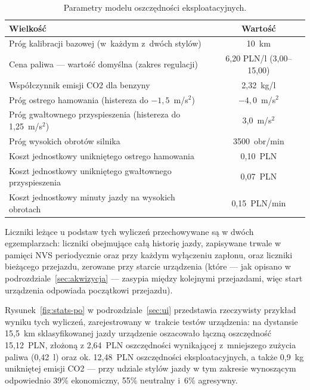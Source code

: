\begin{table}[!h]
    \centering
    \caption{Parametry modelu oszczędności eksploatacyjnych.}
    \label{tab:model-oszczednosci}
    \begin{tabular}{| p{7.8cm} | c |} \hline
        \textbf{Wielkość} & \textbf{Wartość} \\ \hline\hline
        Próg kalibracji bazowej (w~każdym z~dwóch stylów) & 10~km \\ \hline
        Cena paliwa --- wartość domyślna (zakres regulacji) & 6,20 PLN/l (3,00--15,00) \\ \hline
        Współczynnik emisji CO2 dla benzyny & 2,32~kg/l \\ \hline
        Próg ostrego hamowania (histereza do $-1{,}5$~m/s$^2$) & $-4{,}0$~m/s$^2$ \\ \hline
        Próg gwałtownego przyspieszenia (histereza do 1,25~m/s$^2$) & 3,0~m/s$^2$ \\ \hline
        Próg wysokich obrotów silnika & 3500~obr/min \\ \hline
        Koszt jednostkowy unikniętego ostrego hamowania & 0,10~PLN \\ \hline
        Koszt jednostkowy unikniętego gwałtownego przyspieszenia & 0,07~PLN \\ \hline
        Koszt jednostkowy minuty jazdy na wysokich obrotach & 0,15~PLN/min \\ \hline
    \end{tabular}
\end{table}

Liczniki leżące u podstaw tych wyliczeń przechowywane są w dwóch
egzemplarzach: liczniki obejmujące całą historię jazdy, zapisywane trwale
w pamięci NVS periodycznie oraz przy każdym wyłączeniu zapłonu, oraz
liczniki bieżącego przejazdu, zerowane przy starcie urządzenia (które --- jak
opisano w podrozdziale~\ref{sec:akwizycja} --- zasypia między kolejnymi
przejazdami, więc start urządzenia odpowiada początkowi przejazdu).

Rysunek~\ref{fig:stats-po} w podrozdziale~\ref{sec:ui} przedstawia
rzeczywisty przykład wyniku tych wyliczeń, zarejestrowany w~trakcie testów
urządzenia: na dystansie 15,5~km sklasyfikowanej jazdy
urządzenie oszacowało łączną oszczędność 15,12~PLN, złożoną z 2,64~PLN
oszczędności wynikającej z~mniejszego zużycia paliwa (0,42~l) oraz ok.
12,48~PLN oszczędności eksploatacyjnych, a także 0,9~kg unikniętej emisji
CO2 --- przy udziale stylów jazdy w tym zakresie wynoszącym odpowiednio
39\% ekonomiczny, 55\% neutralny i~6\% agresywny.

